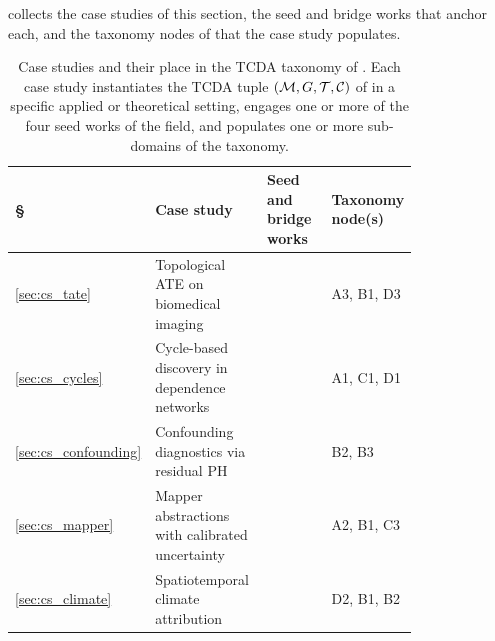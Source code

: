  collects the case studies of this section, the
seed and bridge works that anchor each, and the taxonomy nodes of
 that the case study populates.

\begin{table}[t]
\centering
\caption{Case studies and their place in the TCDA taxonomy of
. Each case study instantiates the TCDA tuple
$(\mathcal{M}, G, \mathcal{T}, \mathcal{C})$ of  in a specific applied or
theoretical setting, engages one or more of the four seed works of
the field, and populates one or more sub-domains of the taxonomy.}
\label{tab:cs_summary}
\begin{tabular}{@{}lp{0.36\linewidth}p{0.28\linewidth}p{0.16\linewidth}@{}}
\toprule
\S & Case study & Seed and bridge works & Taxonomy node(s) \\
\midrule
\ref{sec:cs_tate}        & Topological ATE on biomedical imaging
                         & \citet{kim2026topological,
                                  lecci2014statistical,
                                  soares2020sars,axelrod2022geom}
                         & A3, B1, D3 \\
\ref{sec:cs_cycles}      & Cycle-based discovery in dependence networks
                         & \citet{elyaagoubi2023statistical,
                                  elyaagoubi2023topological,
                                  bando2022causal}
                         & A1, C1, D1 \\
\ref{sec:cs_confounding} & Confounding diagnostics via residual PH
                         & \citet{ibeling2021topological,
                                  mahadevan2025sheaf,
                                  fasy2014confidence}
                         & B2, B3 \\
\ref{sec:cs_mapper}      & Mapper abstractions with calibrated uncertainty
                         & \citet{lecci2014statistical,
                                  singh2007mapper,
                                  carriere2018statistical}
                         & A2, B1, C3 \\
\ref{sec:cs_climate}     & Spatiotemporal climate attribution
                         & \citet{kim2026topological,
                                  sousbie2011persistent,
                                  strommen2025topological}
                         & D2, B1, B2 \\
\bottomrule
\end{tabular}
\end{table}

